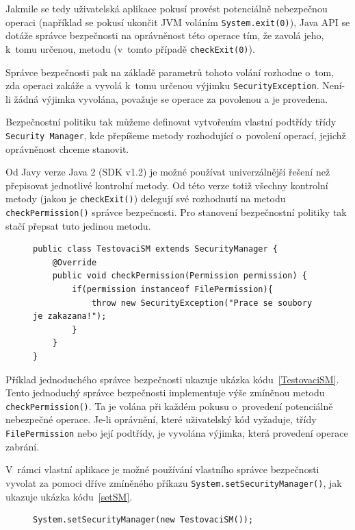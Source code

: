 Jakmile se tedy uživatelská aplikace pokusí provést potenciálně nebezpečnou operaci (například se pokusí ukončit JVM voláním {\tt System.exit(0)}),
Java API se dotáže správce bezpečnosti na oprávněnost této operace tím, že zavolá jeho, k~tomu určenou, metodu (v~tomto případě {\tt checkExit(0)}).~\cite{oaks}

Správce bezpečnosti pak na základě parametrů tohoto volání rozhodne o~tom, zda operaci zakáže a vyvolá k~tomu určenou výjimku {\tt SecurityException}.
Není-li žádná výjimka vyvolána, považuje se operace za povolenou a je provedena.~\cite{oaks}

Bezpečnostní politiku tak můžeme definovat vytvořením vlastní podtřídy třídy {\tt Security Manager}, kde přepíšeme metody rozhodující o~povolení
operací, jejichž oprávněnost chceme stanovit.

Od Javy verze Java 2 (SDK v1.2) je možné používat univerzálnější řešení než přepisovat jednotlivé kontrolní metody.
Od této verze totiž všechny kontrolní metody (jakou je {\tt checkExit()}) delegují své rozhodnutí na metodu {\tt checkPermission()} správce bezpečnosti.
Pro stanovení bezpečnostní politiky tak stačí přepsat tuto jedinou metodu.~\cite{refSecurityManager}

\begin{figure}[b!]
\begin{lstlisting}[caption=Jednoduchý správce bezpečnosti, label=TestovaciSM]
public class TestovaciSM extends SecurityManager {
	@Override
	public void checkPermission(Permission permission) {
		if(permission instanceof FilePermission){
			throw new SecurityException("Prace se soubory je zakazana!");
		}
	}
}
\end{lstlisting}
\end{figure}

Příklad jednoduchého správce bezpečnosti ukazuje ukázka kódu~\ref{TestovaciSM}.
Tento jednoduchý správce bezpečnosti implementuje výše zmíněnou metodu {\tt checkPermission()}.
Ta je volána při každém pokusu o~provedení potenciálně nebezpečné operace.
Je-li oprávnění, které uživatelský kód vyžaduje, třídy {\tt FilePermission} nebo její podtřídy, je vyvolána výjimka, která provedení operace zabrání.

V~rámci vlastní aplikace je možné používání vlastního správce bezpečnosti vyvolat za pomoci dříve zmíněného příkazu {\tt System.setSecurityManager()}, jak ukazuje ukázka kódu~\ref{setSM}.

\begin{figure}[tbh]
\begin{lstlisting}[caption=Nastavení vlastního správce bezpečnosti zevnitř JVM, label=setSM]
System.setSecurityManager(new TestovaciSM());
\end{lstlisting}
\end{figure}

